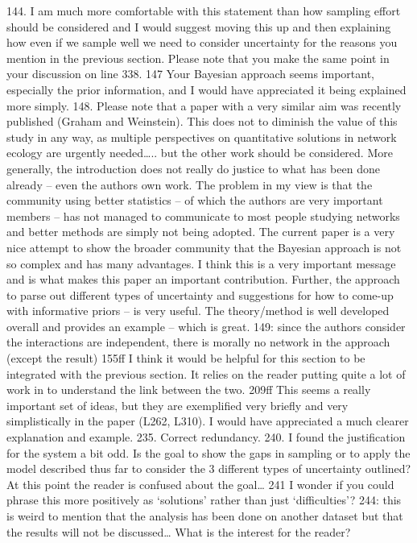 144.  I am much more comfortable with this statement than how sampling effort should be considered and I would suggest moving this up and then explaining how even if we sample well we need to consider uncertainty for the reasons you mention in the previous section.  Please note that you make the same point in your discussion on line 338.
147 Your Bayesian approach seems important, especially the prior information, and I would have appreciated it being explained more simply.
148.  Please note that a paper with a very similar aim was recently published (Graham and Weinstein).  This does not to diminish the value of this study in any way, as multiple perspectives on quantitative solutions in network ecology are urgently needed….. but the other work should be considered. More generally, the introduction does not really do justice to what has been done already – even the authors own work.  The problem in my view is that the community using better statistics – of which the authors are very important members – has not managed to communicate to most people studying networks and better methods are simply not being adopted.  The current paper is a very nice attempt to show the broader community that the Bayesian approach is not so complex and has many advantages.  I think this is a very important message and is what makes this paper an important contribution.  Further, the approach to parse out different types of uncertainty and suggestions for how to come-up with informative priors – is very useful.  The theory/method is well developed overall and provides an example – which is great.
149: since the authors consider the interactions are independent, there is morally no network in the approach (except the result)
155ff I think it would be helpful for this section to be integrated with the previous section. It relies on the reader putting quite a lot of work in to understand the link between the two.
209ff This seems a really important set of ideas, but they are exemplified very briefly and very simplistically in the paper (L262, L310). I would have appreciated a much clearer explanation and example.
235.  Correct redundancy.
240.  I found the justification for the system a bit odd.  Is the goal to show the gaps in sampling or to apply the model described thus far to consider the 3 different types of uncertainty outlined?  At this point the reader is confused about the goal…
241 I wonder if you could phrase this more positively as ‘solutions’ rather than just ‘difficulties’?
244: this is weird to mention that the analysis has been done on another dataset but that the results will not be discussed… What is the interest for the reader?
